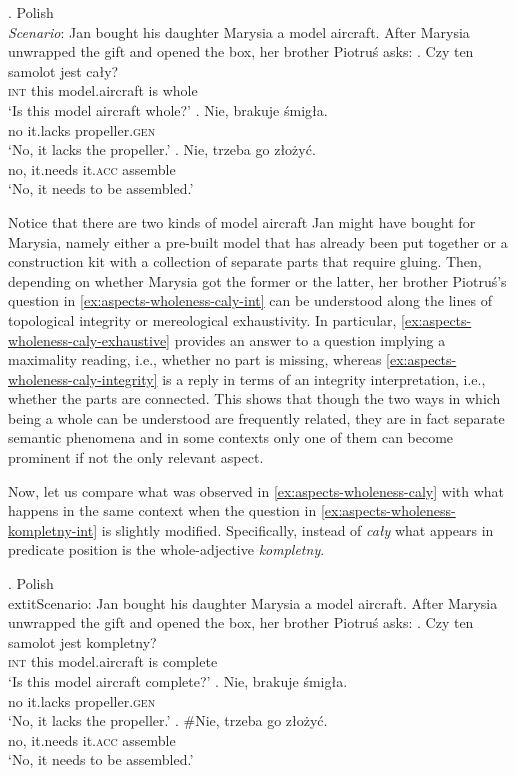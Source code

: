 \ex. Polish\\
\textit{Scenario}: Jan bought his daughter Marysia a model aircraft. After Marysia unwrapped the gift and opened the box, her brother Piotruś asks:\label{ex:aspects-wholeness-caly}
\ag. Czy ten samolot jest cały?\label{ex:aspects-wholeness-caly-int}\\
\textsc{int} this model.aircraft is whole\\
`Is this model aircraft whole?'
\bg. Nie, brakuje śmigła.\label{ex:aspects-wholeness-caly-exhaustive}\\
no it.lacks propeller\textsc{.gen}\\
`No, it lacks the propeller.'
\bg. Nie, trzeba go złożyć.\label{ex:aspects-wholeness-caly-integrity}\\
no, it.needs it\textsc{.acc} assemble\\
`No, it needs to be assembled.'

Notice that there are two kinds of model aircraft Jan might have bought for Marysia, namely either a pre-built model that has already been put together or a construction kit with a collection of separate parts that require gluing. Then, depending on whether Marysia got the former or the latter, her brother Piotruś's question in \ref{ex:aspects-wholeness-caly-int} can be understood along the lines of topological integrity or mereological exhaustivity. In particular, \ref{ex:aspects-wholeness-caly-exhaustive} provides an answer to a question implying a maximality reading, i.e., whether no part is missing, whereas \ref{ex:aspects-wholeness-caly-integrity} is a reply in terms of an integrity interpretation, i.e., whether the parts are connected. This shows that though the two ways in which being a whole can be understood are frequently related, they are in fact separate semantic phenomena and in some contexts only one of them can become prominent if not the only relevant aspect.

Now, let us compare what was observed in \ref{ex:aspects-wholeness-caly} with what happens in the same context when the question in \ref{ex:aspects-wholeness-kompletny-int} is slightly modified. Specifically, instead of \textit{cały} what appears in predicate position is the whole-adjective \textit{kompletny}. 

\ex. Polish\\
	extit{Scenario}: Jan bought his daughter Marysia a model aircraft. After Marysia unwrapped the gift and opened the box, her brother Piotruś asks:\label{ex:aspects-wholeness-kompletny}
\ag. Czy ten samolot jest kompletny?\label{ex:aspects-wholeness-kompletny-int}\\
\textsc{int} this model.aircraft is complete\\
`Is this model aircraft complete?'
\bg. Nie, brakuje śmigła.\label{ex:aspects-wholeness-kompletny-exhaustive}\\
no it.lacks propeller\textsc{.gen}\\
`No, it lacks the propeller.'
\bg. \#Nie, trzeba go złożyć.\label{ex:aspects-wholeness-kompletny-integrity}\\
no, it.needs it\textsc{.acc} assemble\\
`No, it needs to be assembled.'

